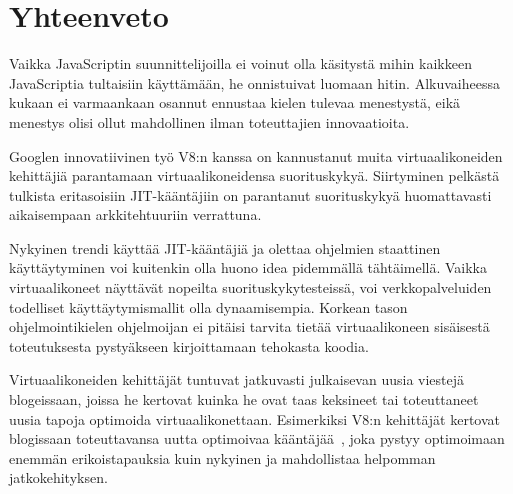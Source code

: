 \section{Yhteenveto}

Vaikka JavaScriptin suunnittelijoilla ei voinut olla käsitystä mihin kaikkeen JavaScriptia tultaisiin käyttämään, he onnistuivat luomaan hitin. Alkuvaiheessa kukaan ei varmaankaan osannut ennustaa kielen tulevaa menestystä, eikä menestys olisi ollut mahdollinen ilman toteuttajien innovaatioita.

Googlen innovatiivinen työ V8:n kanssa on kannustanut muita virtuaalikoneiden kehittäjiä parantamaan virtuaalikoneidensa suorituskykyä. Siirtyminen pelkästä tulkista eritasoisiin JIT-kääntäjiin on parantanut suorituskykyä huomattavasti aikaisempaan arkkitehtuuriin verrattuna.

Nykyinen trendi käyttää JIT-kääntäjiä ja olettaa ohjelmien staattinen käyttäytyminen voi kuitenkin olla huono idea pidemmällä tähtäimellä. Vaikka virtuaalikoneet näyttävät nopeilta suorituskykytesteissä, voi verkkopalveluiden todelliset käyttäytymismallit olla dynaamisempia. Korkean tason ohjelmointikielen ohjelmoijan ei pitäisi tarvita tietää virtuaalikoneen sisäisestä toteutuksesta pystyäkseen kirjoittamaan tehokasta koodia.

Virtuaalikoneiden kehittäjät tuntuvat jatkuvasti julkaisevan uusia viestejä blogeissaan, joissa he kertovat kuinka he ovat taas keksineet tai toteuttaneet uusia tapoja optimoida virtuaalikonettaan. Esimerkiksi V8:n kehittäjät kertovat blogissaan toteuttavansa uutta optimoivaa kääntäjää~\cite{turbofan}, joka pystyy optimoimaan enemmän erikoistapauksia kuin nykyinen ja mahdollistaa helpomman jatkokehityksen.